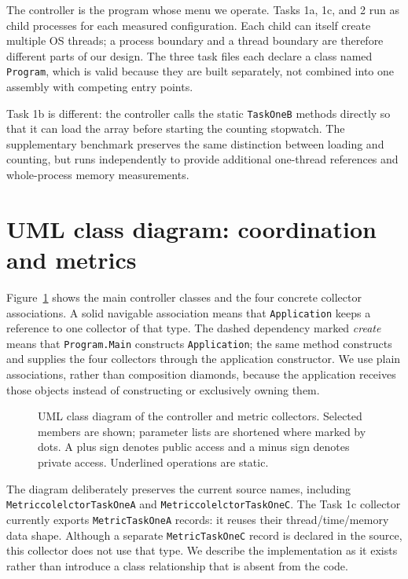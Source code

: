 The controller is the program whose menu we operate. Tasks 1a, 1c, and 2 run as child processes for each measured configuration. Each child can itself create multiple OS threads; a process boundary and a thread boundary are therefore different parts of our design. The three task files each declare a class named \texttt{Program}, which is valid because they are built separately, not combined into one assembly with competing entry points.

Task 1b is different: the controller calls the static \texttt{TaskOneB} methods directly so that it can load the array before starting the counting stopwatch. The supplementary benchmark preserves the same distinction between loading and counting, but runs independently to provide additional one-thread references and whole-process memory measurements.

\section{UML class diagram: coordination and metrics}
Figure~\ref{fig:umlclasses} shows the main controller classes and the four concrete collector associations. A solid navigable association means that \texttt{Application} keeps a reference to one collector of that type. The dashed dependency marked \emph{create} means that \texttt{Program.Main} constructs \texttt{Application}; the same method constructs and supplies the four collectors through the application constructor. We use plain associations, rather than composition diamonds, because the application receives those objects instead of constructing or exclusively owning them.

\begin{figure}[H]\centering
\begingroup\singlespacing
\resizebox{\textwidth}{!}{}
\endgroup
\caption{UML class diagram of the controller and metric collectors. Selected members are shown; parameter lists are shortened where marked by dots. A plus sign denotes public access and a minus sign denotes private access. Underlined operations are static.}\label{fig:umlclasses}
\end{figure}

The diagram deliberately preserves the current source names, including \texttt{MetriccolelctorTaskOneA} and \texttt{MetriccolelctorTaskOneC}. The Task 1c collector currently exports \texttt{MetricTaskOneA} records: it reuses their thread/time/memory data shape. Although a separate \texttt{MetricTaskOneC} record is declared in the source, this collector does not use that type. We describe the implementation as it exists rather than introduce a class relationship that is absent from the code.

